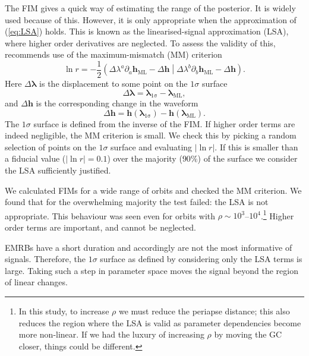 \documentclass[useAMS,usedcolumn,usegraphicx,usenatbib]{mn2e}
\newcommand{\eqnref}[1]{(\ref{eq:#1})}
\newcommand{\sub}[1]{\ensuremath{_\mathrm{#1}}}
\newcommand{\recip}[1]{\ensuremath{\frac{1}{#1}}}
\newcommand{\innerprod}[2]{\ensuremath{\left({#1}\middle|{#2}\right)}}
\begin{document}
The FIM gives a quick way of estimating the range of the posterior. It is widely used because of this. However, it is only appropriate when the approximation of \eqnref{LSA} holds. This is known as the linearised-signal approximation (LSA), where higher order derivatives are neglected. To assess the validity of this, \citet{Vallisneri2008} recommends use of the maximum-mismatch (MM) criterion
\begin{equation}
\ln r = -\recip{2}\innerprod{\Delta\lambda^a\partial_a\boldsymbol{h}\sub{ML} - \Delta\boldsymbol{h}}{\Delta\lambda^b\partial_b\boldsymbol{h}\sub{ML} - \Delta\boldsymbol{h}}.
\end{equation}
Here $\Delta \boldsymbol{\lambda}$ is the displacement to some point on the $1\sigma$ surface
\begin{equation}
\Delta \boldsymbol{\lambda} = \boldsymbol{\lambda}\sub{1\sigma} - \boldsymbol{\lambda}\sub{ML},
\end{equation}
and $\Delta \boldsymbol{h}$ is the corresponding change in the waveform
\begin{equation}
\Delta \boldsymbol{h} = \boldsymbol{h}(\boldsymbol{\lambda}\sub{1\sigma}) - \boldsymbol{h}(\boldsymbol{\lambda}\sub{ML}).
\end{equation}
The $1\sigma$ surface is defined from the inverse of the FIM. If higher order terms are indeed negligible, the MM criterion is small. We check this by picking a random selection of points on the $1\sigma$ surface and evaluating $|\ln r|$. If this is smaller than a fiducial value ($|\ln r| = 0.1$) over the majority ($90\%$) of the surface we consider the LSA sufficiently justified.

We calculated FIMs for a wide range of orbits and checked the MM criterion. We found that for the overwhelming majority the test failed: the LSA is not appropriate. This behaviour was seen even for orbits with $\rho \sim 10^3$--$10^4$.\footnote{In this study, to increase $\rho$ we must reduce the periapse distance; this also reduces the region where the LSA is valid as parameter dependencies become more non-linear. If we had the luxury of increasing $\rho$ by moving the GC closer, things could be different.} Higher order terms are important, and cannot be neglected.

EMRBs have a short duration and accordingly are not the most informative of signals. Therefore, the $1\sigma$ surface as defined by considering only the LSA terms is large. Taking such a step in parameter space moves the signal beyond the region of linear changes.
\end{document}
